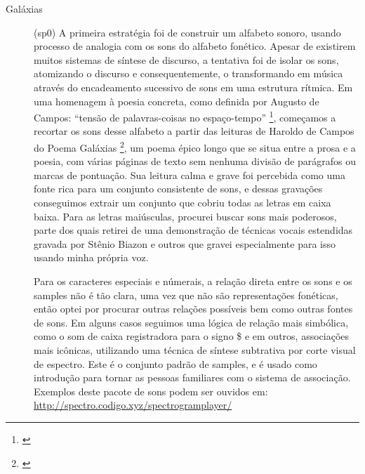 \begin{description}
 \item[Galáxias] (sp0) A primeira estratégia foi de construir um alfabeto sonoro, usando processo de analogia com os sons do alfabeto fonético. Apesar de existirem muitos sistemas de síntese de discurso, a tentativa foi de isolar os sons, atomizando o discurso e consequentemente, o transformando em música através do encadeamento sucessivo de sons em uma estrutura rítmica. 
Em uma homenagem à poesia concreta, como definida por Augusto de Campos: ``tensão de palavras-coisas no espaço-tempo'' \footnote{\cite[45]{campos_teoria_2014}}, começamos a recortar os sons desse alfabeto a partir das leituras de Haroldo de Campos do Poema Galáxias \footnote{\cite{Campos2004}}, um poema épico longo que se situa entre a prosa e a poesia, com várias páginas de texto sem nenhuma divisão de parágrafos ou marcas de pontuação. Sua leitura calma e grave foi percebida como uma fonte rica para um conjunto consistente de sons, e dessas gravações conseguimos extrair um conjunto que cobriu todas as letras em caixa baixa. Para as letras maiúsculas, procurei buscar sons mais poderosos, parte dos quais retirei de uma demonstração de técnicas vocais estendidas gravada por Stênio Biazon e outros que gravei especialmente para isso usando minha própria voz.  

Para os caracteres especiais e númerais, a relação direta entre os sons e os samples não é tão clara, uma vez que não são representações fonéticas, então optei por procurar outras relações possíveis bem como outras fontes de sons. Em alguns casos seguimos uma lógica de relação mais simbólica, como o som de caixa registradora para o signo \$ e em outros, associações mais icônicas, utilizando uma técnica de síntese subtrativa por corte visual de espectro. Este é o conjunto padrão de samples, e é usado como introdução para tornar as pessoas familiares com o sistema de associação. Exemplos deste pacote de sons podem ser ouvidos em: \url{http://spectro.codigo.xyz/spectrogramplayer/}


\end{description}
